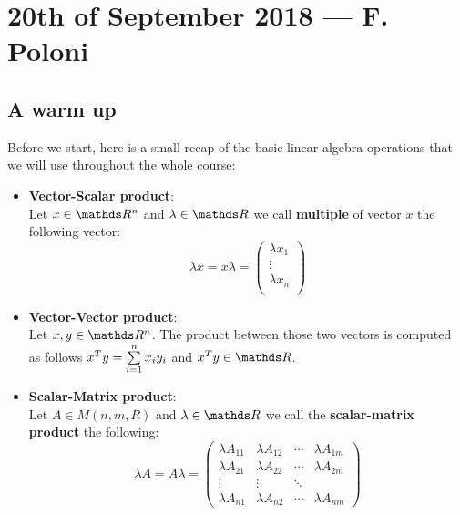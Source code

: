 \documentclass[computationalMathematics.tex]{subfiles}
\begin{document}
\chapter{20th of September 2018 --- F. Poloni}

\section{A warm up}
Before we start, here is a small recap of the basic linear algebra operations that we will use throughout the whole course:
\begin{itemize}
    \item \textbf{Vector-Scalar product}:\\
      Let $x \in \R^n$ and $\lambda \in \R$ we call \textbf{multiple} of vector $x$ the following vector:
      \[
        \lambda x = x \lambda =
        \begin{pmatrix}
        \lambda x_1\\
        \vdots\\
        \lambda x_n\\
      \end{pmatrix}
      \]
    
    \item \textbf{Vector-Vector product}:\\
      Let $x, y \in \R^n$. The product between those two vectors is computed as follows ${x}^{T} y = \sum\limits_{i=1}^n x_i y_i$ and $\tr{x}y \in \R$.
     
     \item \textbf{Scalar-Matrix product}:\\
      Let $A \in M(n, m, R)$ and $\lambda \in \R$ we call the \textbf{scalar-matrix product} the following:
      \[
        \lambda A = A \lambda = 
        \begin{pmatrix}
        \lambda A_{11} & \lambda A_{12} & \cdots & \lambda A_{1m}\\
        \lambda A_{21} & \lambda A_{22} & \cdots & \lambda A_{2m}\\
        \vdots  &\vdots & \ddots\\
        \lambda A_{n1} & \lambda A_{n2} & \cdots & \lambda A_{nm}
        \end{pmatrix}
      \]
     

\end{itemize}
\end{document}
